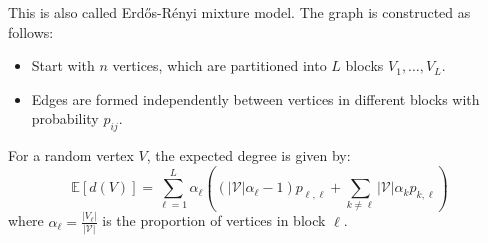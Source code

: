 \documentclass{article}
\begin{document}
This is also called Erd\H{o}s-R\'{e}nyi mixture model. The graph is constructed as follows:
\begin{itemize}
    \item Start with $n$ vertices, which are partitioned into $L$ blocks $V_1,\ldots,V_L$.
    \item Edges are formed independently between vertices in different blocks with probability $p_{ij}$.
\end{itemize}

\begin{proposition}
    For a random vertex $V$, the expected degree is given by:
    \begin{equation*}
        \mathbb{E}[d(V)] = \sum_{\ell=1}^L \alpha_{\ell}\left((|\mathcal{V}|\alpha_{\ell}-1)p_{\ell,\ell}+\sum_{k\ne\ell}|\mathcal{V}|\alpha_{k}p_{k,\ell}\right)
    \end{equation*}
    where $\alpha_{\ell} = \frac{|V_{\ell}|}{|\mathcal{V}|}$ is the proportion of vertices in block $\ell$.
\end{proposition}
\end{document}
